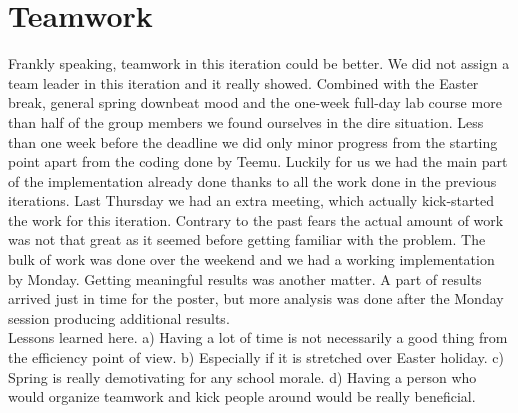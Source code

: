 \section{Teamwork}
Frankly speaking, teamwork in this iteration could be better. We did not assign a team leader in this iteration and it really showed. Combined with the Easter break, general spring downbeat mood and the one-week full-day lab course more than half of the group members we found ourselves in the dire situation. Less than one week before the deadline we did only minor progress from the starting point apart from the coding done by Teemu. Luckily for us we had the main part of the implementation already done thanks to all the work done in the previous iterations. Last Thursday we had an extra meeting, which actually kick-started the work for this iteration. Contrary to the past fears the actual amount of work was not that great as it seemed before getting familiar with the problem. The bulk of work was done over the weekend and we had a working implementation by Monday. Getting meaningful results was another matter. A part of results arrived just in time for the poster, but more analysis was done after the Monday session producing additional results.\\

Lessons learned here. a) Having a lot of time is not necessarily a good thing from the efficiency point of view. b) Especially if it is stretched over Easter holiday. c) Spring is really demotivating for any school morale. d) Having a person who would organize teamwork and kick people around would be really beneficial.
